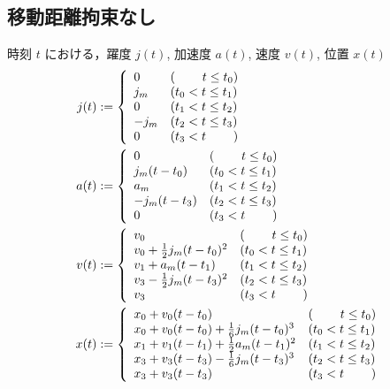 \documentclass[a5paper]{ltjsarticle}
\begin{document}
\subsection{移動距離拘束なし}
時刻 $t$ における，躍度 $j(t)$, 加速度 $a(t)$, 速度 $v(t)$, 位置 $x(t)$
\begin{align}
    j(t)
     & :=
    \left\{ \begin{array}{ll}
        0    & (\hspace{2.2em}t \le t_0) \\
        j_m  & (t_0 < t \le t_1)         \\
        0    & (t_1 < t \le t_2)         \\
        -j_m & (t_2 < t \le t_3)         \\
        0    & (t_3 < t \hspace{2.2em})
    \end{array} \right.
    \\
    a(t)
     & :=
    \left\{ \begin{array}{ll}
        0           & (\hspace{2.2em}t \le t_0) \\
        j_m(t-t_0)  & (t_0 < t \le t_1)         \\
        a_m         & (t_1 < t \le t_2)         \\
        -j_m(t-t_3) & (t_2 < t \le t_3)         \\
        0           & (t_3 < t \hspace{2.2em})
    \end{array} \right.
    \\
    v(t)
     & :=
    \left\{ \begin{array}{ll}
        v_0                           & (\hspace{2.2em} t \le t_0) \\
        v_0 + \frac{1}{2}j_m(t-t_0)^2 & (t_0 < t \le t_1)          \\
        v_1 + a_m(t-t_1)              & (t_1 < t \le t_2)          \\
        v_3 - \frac{1}{2}j_m(t-t_3)^2 & (t_2 < t \le t_3)          \\
        v_3                           & (t_3 < t \hspace{2.2em})
    \end{array} \right.
    \\
    x(t)
     & :=
    \left\{ \begin{array}{ll}
        x_0 + v_0(t-t_0)                           & (\hspace{2.2em} t \le t_0) \\
        x_0 + v_0(t-t_0) + \frac{1}{6}j_m(t-t_0)^3 & (t_0 < t \le t_1)          \\
        x_1 + v_1(t-t_1) + \frac{1}{2}a_m(t-t_1)^2 & (t_1 < t \le t_2)          \\
        x_3 + v_3(t-t_3) - \frac{1}{6}j_m(t-t_3)^3 & (t_2 < t \le t_3)          \\
        x_3 + v_3(t-t_3)                           & (t_3 < t \hspace{2.2em})
    \end{array} \right.
\end{align}
\end{document}
